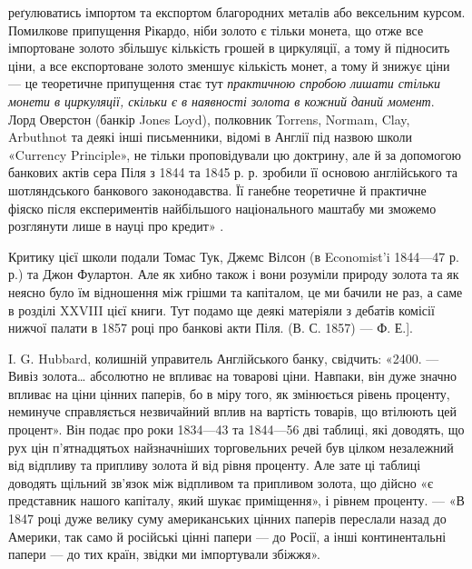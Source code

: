 \parcont{}  %
реґулюватись імпортом та експортом благородних металів або вексельним курсом.
Помилкове припущення Рікардо, ніби золото є тільки монета, що отже все імпортоване
золото збільшує кількість грошей в циркуляції, а тому й підносить ціни,
а все експортоване золото зменшує кількість монет, а тому й знижує ціни —
це теоретичне припущення стає тут \emph{практичною спробою лишати стільки
монети в циркуляції, скільки є в наявності золота в кожний даний
момент}. Лорд Оверстон (банкір Jones Loyd), полковник Torrens, Normam, Clay,
Arbuthnot та деякі інші письменники, відомі в Англії під назвою школи «Currency
Principle», не тільки проповідували цю доктрину, але й за допомогою банкових
актів сера Піля з 1844 та 1845 р. р. зробили її основою англійського та шотляндського
банкового законодавства. Її ганебне теоретичне й практичне фіяско після
експериментів найбільшого національного маштабу ми зможемо розглянути лише
в науці про кредит» .

Критику цієї школи подали Томас Тук, Джемс Вілсон (в Economist’i 1844—47 р. р.)
та Джон Фулартон. Але як хибно також і вони розуміли природу золота
та як неясно було їм відношення між грішми та капіталом, це ми бачили не
раз, а саме в розділі XXVIII цієї книги. Тут подамо ще деякі матеріяли з дебатів
комісії нижчої палати в 1857 році про банкові акти Піля. (В. С. 1857) — Ф. Е.].

I. G. Hubbard, колишній управитель Англійського банку, свідчить: «2400. —
Вивіз золота\dots{} абсолютно не впливає на товарові ціни. Навпаки, він дуже
значно впливає на ціни цінних паперів, бо в міру того, як змінюється рівень
проценту, неминуче справляється незвичайний вплив на вартість товарів, що втілюють
цей процент». Він подає про роки 1834—43 та 1844—56 дві таблиці,
які доводять, що рух цін п’ятнадцятьох найзначніших торговельних речей був
цілком незалежний від відпливу та припливу золота й від рівня проценту. Але
зате ці таблиці доводять щільний зв’язок між відпливом та припливом золота,
що дійсно «є представник нашого капіталу, який шукає приміщення», і рівнем
проценту. — «В 1847 році дуже велику суму американських цінних паперів переслали
назад до Америки, так само й російські цінні папери — до Росії, а інші
континентальні папери — до тих країн, звідки ми імпортували збіжжя».

